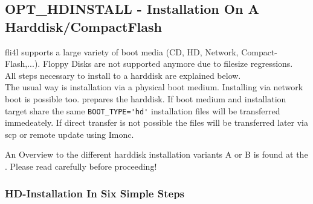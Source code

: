 

\subsection {OPT\_HDINSTALL - Installation On A Harddisk/CompactFlash}

    fli4l supports a large variety of boot media (CD, HD, Network, 
    Compact-Flash,...). Floppy Disks are not supported anymore due to  
    filesize regressions.\\

    All steps necessary to install to a harddisk are explained below.\\

    The usual way is installation via a physical boot medium. Installing via 
    network boot is possible too.  prepares the harddisk. 
    If boot medium and installation target share the same \verb*?BOOT_TYPE='hd'? 
    installation files will be transferred immedeately. If direct transfer is 
    not possible the files will be transferred later via scp or remote update 
    using Imonc.
    
    An Overview to the different harddisk installation variants A or B is found 
    at the . Please read 
    carefully before proceeding!

    \subsubsection{HD-Installation In Six Simple Steps}

